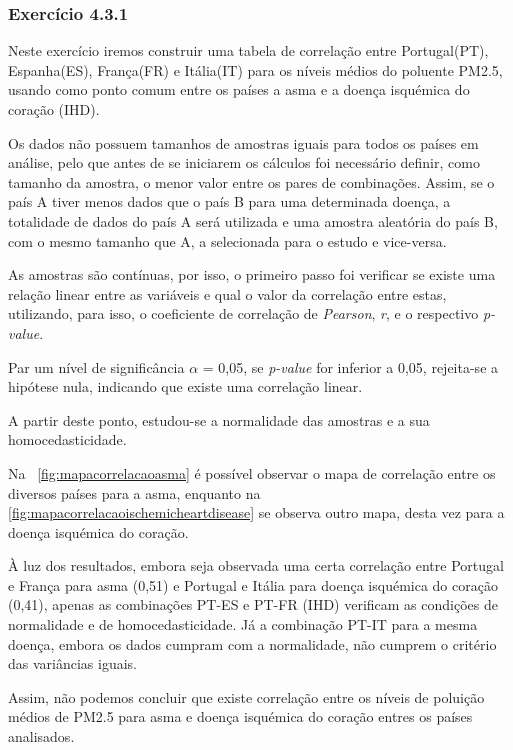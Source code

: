 \documentclass[conference]{IEEEtran}
\begin{document}
\subsubsection{\textbf{Exercício 4.3.1}}

Neste exercício iremos construir uma tabela de correlação entre Portugal(PT), Espanha(ES), França(FR) e Itália(IT) para os níveis médios do poluente PM2.5, usando como ponto comum entre os países a asma e a doença isquémica do coração (IHD).

Os dados não possuem tamanhos de amostras iguais para todos os países em análise, pelo que antes de se iniciarem os cálculos foi necessário definir, como tamanho da amostra, o menor valor entre os pares de combinações. Assim, se o país A tiver menos dados que o país B para uma determinada doença, a totalidade de dados do país A será utilizada e uma amostra aleatória do país B, com o mesmo tamanho que A, a selecionada para o estudo e vice-versa.

As amostras são contínuas, por isso, o primeiro passo foi verificar se existe uma relação linear entre as variáveis e qual o valor da correlação entre estas, utilizando, para isso, o coeficiente de correlação de \textit{Pearson}, \textit{r}, e o respectivo \textit{p-value}.

Par um nível de significância $\alpha$ = 0,05, se \textit{p-value} for inferior a 0,05, rejeita-se a hipótese nula, indicando que existe uma correlação linear.
 
A partir deste ponto, estudou-se a normalidade das amostras e a sua homocedasticidade. 


Na \figurename~\ref{fig:mapacorrelacaoasma} é possível observar o mapa de correlação entre os diversos países para a asma, enquanto na \figurename~ \ref{fig:mapacorrelacaoischemicheartdisease} se observa outro mapa, desta vez para a doença isquémica do coração.


À luz dos resultados, embora seja observada uma certa correlação entre Portugal e França para asma (0,51) e Portugal e Itália para doença isquémica do coração (0,41), apenas as combinações PT-ES e PT-FR (IHD) verificam as condições de normalidade e de homocedasticidade. Já a combinação PT-IT para a mesma doença, embora os dados cumpram com a normalidade, não cumprem o critério das variâncias iguais.

Assim, não podemos concluir que existe correlação entre os níveis de poluição médios de PM2.5 para asma e doença isquémica do coração entres os países analisados.
\end{document}

